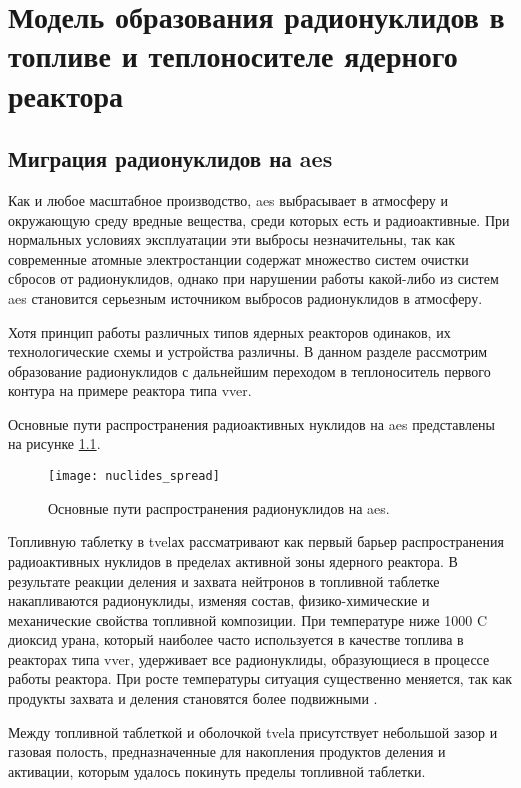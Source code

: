 \chapter{Модель образования радионуклидов в топливе и теплоносителе ядерного реактора}

\section{Миграция радионуклидов на \ac{aes}}

Как и любое масштабное производство, \ac{aes} выбрасывает в атмосферу и окружающую среду вредные вещества, среди 
которых есть и радиоактивные. При нормальных условиях эксплуатации эти выбросы незначительны, так как современные 
атомные электростанции содержат множество систем очистки сбросов от радионуклидов, однако при нарушении работы 
какой-либо из систем \ac{aes} становится серьезным источником выбросов радионуклидов в атмосферу. 

Хотя принцип работы различных типов ядерных реакторов одинаков, их технологические схемы и устройства различны. В 
данном разделе рассмотрим образование радионуклидов с дальнейшим переходом в теплоноситель первого контура на примере 
реактора типа \ac{vver}.

Основные пути распространения радиоактивных нуклидов на \ac{aes} представлены на рисунке \ref{fig_nuclides_spread}.

\begin{figure}[ht]
\centering
	\texttt{[image: nuclides\_spread]}
	\captionsetup{justification=centering}
    \caption{Основные пути распространения радионуклидов на \ac{aes}.}
    \label{fig_nuclides_spread}
\end{figure}

Топливную таблетку в \ac{tvel}ах рассматривают как первый барьер распространения радиоактивных нуклидов в пределах 
активной зоны ядерного реактора. В результате реакции деления и захвата нейтронов в топливной таблетке накапливаются 
радионуклиды, изменяя состав, физико-химические и механические свойства топливной композиции. При температуре ниже 
1000 \degree C диоксид урана, который наиболее часто используется в качестве топлива в реакторах типа \ac{vver}, 
удерживает все радионуклиды, образующиеся в процессе работы реактора. При росте температуры ситуация существенно 
меняется, так как продукты захвата и деления становятся более подвижными \cite{leskin_vver}.

Между топливной таблеткой и оболочкой \ac{tvel}а присутствует небольшой зазор и газовая полость, предназначенные для 
накопления продуктов деления и активации, которым удалось покинуть пределы топливной таблетки.

